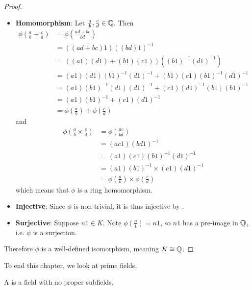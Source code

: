 \begin{proof}
\begin{itemize}
        \item \textbf{Homomorphism}: Let $\frac ab, \frac cd \in \mathbb{Q}$. Then
        \begin{align*}
            \phi\left(\frac ab + \frac cd\right) &= \phi\left(\frac{ad + bc}{bd}\right)\\
            &= ((ad + bc)1)((bd)1)^{-1}\\
            &= \left((a1)(d1) + (b1)(c1)\right)\left((b1)^{-1}(d1)^{-1}\right)\\
            &= (a1)(d1)(b1)^{-1}(d1)^{-1} + (b1)(c1)(b1)^{-1}(d1)^{-1}\\
            &= (a1)(b1)^{-1}(d1)(d1)^{-1} + (c1)(d1)^{-1}(b1)(b1)^{-1}\\
            &= (a1)(b1)^{-1} + (c1)(d1)^{-1}\\
            &= \phi\left(\frac ab\right) + \phi\left(\frac cd\right)
        \end{align*}
        and
        \begin{align*}
            \phi\left(\frac ab \times \frac cd\right) &= \phi\left(\frac{ac}{bd}\right)\\
            &= (ac1)(bd1)^{-1}\\
            &= (a1)(c1)(b1)^{-1}(d1)^{-1}\\
            &= (a1)(b1)^{-1} \times (c1)(d1)^{-1}\\
            &= \phi\left(\frac ab\right) \times \phi\left(\frac cd\right)
        \end{align*}
        which means that $\phi$ is a ring homomorphism.

        \item \textbf{Injective}: Since $\phi$ is non-trivial, it is thus injective by .

        \item \textbf{Surjective}: Suppose $n1 \in K$. Note $\phi(\frac n1) = n1$, so $n1$ has a pre-image in $\mathbb{Q}$, i.e. $\phi$ is a surjection.
    \end{itemize}
    Therefore $\phi$ is a well-defined isomorphism, meaning $K \cong \mathbb{Q}$.
\end{proof}

To end this chapter, we look at prime fields.

\begin{definition}
    A  is a field with no proper subfields.
\end{definition}

